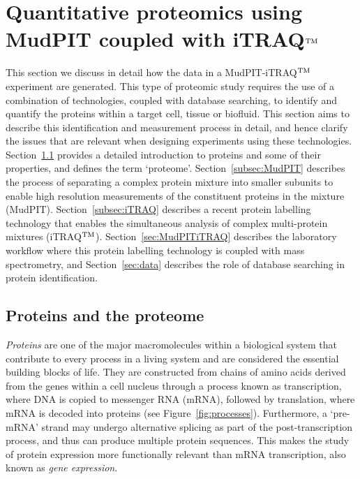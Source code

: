  
\section{Quantitative proteomics using MudPIT coupled with iTRAQ$^{\rm TM}$}
\label{sec:proteomicExpt}
This section we discuss in detail how the data in a MudPIT-iTRAQ$^{\rm TM}$ experiment are generated. This type of proteomic study requires the use of a combination of technologies, coupled with database searching, to identify and quantify the proteins within a target cell, tissue or biofluid. This section aims to describe this identification and measurement process in detail, and hence clarify the issues that are relevant when designing experiments using these technologies. Section~\ref{subsec:protein} provides a detailed introduction to proteins and some of their properties, and defines the term `proteome'. Section~\ref{subsec:MudPIT} describes the process of separating a complex protein mixture into smaller subunits to enable high resolution measurements of the constituent proteins in the mixture (MudPIT). Section~\ref{subsec:iTRAQ} describes a recent protein labelling technology that enables the simultaneous analysis of complex multi-protein mixtures (iTRAQ$^{\rm TM}$). Section~\ref{sec:MudPITiTRAQ} describes the laboratory workflow where this protein labelling technology is coupled with mass spectrometry, and Section~\ref{sec:data} describes the role of database searching in protein identification.


\subsection{Proteins and the proteome}
\label{subsec:protein}
\emph{Proteins} are one of the major macromolecules within a biological system that contribute to every process in a living system and are considered the essential building blocks of life. They are constructed from chains of amino acids derived from the genes within a cell nucleus through a process known as transcription, where DNA is copied to messenger RNA (mRNA), followed by translation, where mRNA is decoded into proteins (see Figure~\ref{fig:processes}). Furthermore, a `pre-mRNA' strand may undergo alternative splicing as part of the post-transcription process, and thus can produce multiple protein sequences. This makes the study of protein expression more functionally relevant than mRNA transcription, also known as \emph{gene expression}.

